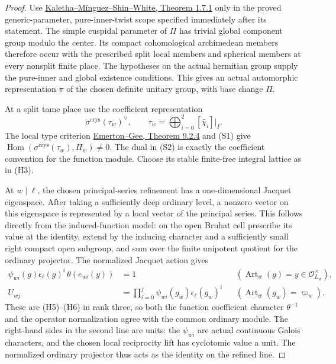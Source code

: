 \begin{proof}
Use
\href{https://arxiv.org/pdf/1409.3731v3}
{Kaletha--M\'inguez--Shin--White, Theorem 1.7.1}
only in the proved generic-parameter, pure-inner-twist
scope specified immediately after its statement.
The simple cuspidal parameter of \(\Pi\) has trivial global
component group modulo the center.
Its compact cohomological archimedean members therefore
occur with the prescribed split local members and
spherical members at every nonsplit finite place.
The hypotheses on the actual hermitian group supply
the pure-inner and global existence conditions.
This gives an actual automorphic representation \(\pi\)
of the chosen definite unitary group, with base change \(\Pi\).

At a split tame place use the coefficient representation
\[
                   \sigma^{\mathrm{crys}}(\tau_w)^\vee,
       \qquad \tau_w=\bigoplus_{i=0}^2[\bar\chi_i]|_I .
 \tag{S2}
\]
The local type criterion
\href{https://math.uchicago.edu/~emerton/pdffiles/bonn-lectures-survey-article.pdf}
{Emerton--Gee, Theorem 9.2.4}
and (S1) give
\(\operatorname{Hom}(\sigma^{\mathrm{crys}}(\tau_w),\Pi_w)
\ne0\).
The dual in (S2) is exactly the coefficient convention for
the function module. Choose its stable finite-free integral
lattice as in (H3).

At \(w\mid\ell\), the chosen principal-series refinement
has a one-dimensional Jacquet eigenspace.
After taking a sufficiently deep ordinary level, a
nonzero vector on this eigenspace is represented by a
local vector of the principal series.
This follows directly from the induced-function model:
on the open Bruhat cell prescribe its value at the identity,
extend by the inducing character and a sufficiently small
right compact open subgroup, and sum over the finite
unipotent quotient for the ordinary projector.
The normalized Jacquet action gives
\[
 \begin{aligned}
 \psi_{wi}(g)\epsilon_\ell(g)^i\,
                      \theta(e_{wi}(y))&=1
                  &&(\operatorname{Art}_w(g)=y\in\mathcal O_{L_w}^\times),\\
 U_{wj}&=\prod_{i=0}^j
                \psi_{wi}(g_w)\epsilon_\ell(g_w)^i
                  &&(\operatorname{Art}_w(g_w)=\varpi_w).
 \end{aligned}
 \tag{S3}
\]
These are (H5)--(H6) in rank three, so both the function
coefficient character \(\theta^{-1}\) and the operator
normalization agree with the common ordinary module.
The right-hand sides in the second line are units:
the \(\psi_{wi}\) are actual continuous Galois characters,
and the chosen local reciprocity lift has cyclotomic
value a unit.
The normalized ordinary projector thus acts as the
identity on the refined line.


\end{proof}
